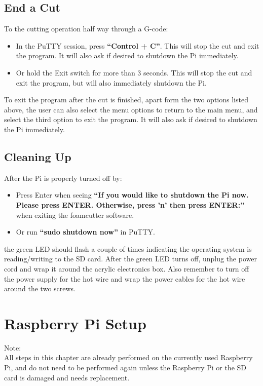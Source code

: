 \documentclass[titlepage,12pt,letter]{report}
\numberwithin{equation}{chapter}
\begin{document}
\section{End a Cut}
To the cutting operation half way through a G-code:
\begin{itemize}[noitemsep,topsep=0pt]
	\item In the PuTTY session, press \textbf{``Control + C''}. This will stop the cut and exit the program. It will also ask if desired to shutdown the Pi immediately.
	\item Or hold the Exit switch for more than 3 seconds. This will stop the cut and exit the program, but will also immediately shutdown the Pi.
\end{itemize}

To exit the program after the cut is finished, apart form the two options listed above, the user can also select the menu options to return to the main menu, and select the third option to exit the program. It will also ask if desired to shutdown the Pi immediately.

\section{Cleaning Up}
After the Pi is properly turned off by:
\begin{itemize}[noitemsep,topsep=0pt]
	\item Press Enter when seeing \textbf{``If you would like to shutdown the Pi now. Please press ENTER. Otherwise, press 'n' then press ENTER:''} when exiting the foamcutter software.
	\item Or run \textbf{``sudo shutdown now''} in PuTTY.
\end{itemize}
the green LED should flash a couple of times indicating the operating system is reading/writing to the SD card. After the green LED turns off, unplug the power cord and wrap it around the acrylic electronics box. Also remember to turn off the power supply for the hot wire and wrap the power cables for the hot wire around the two screws. 


\newpage
\chapter{Raspberry Pi Setup}
\begin{tcolorbox}
	{\large
		Note: \\
		All steps in this chapter are already performed on the currently used Raspberry Pi, and do not need to be performed again unless the Raspberry Pi or the SD card is damaged and needs replacement. 
	}
\end{tcolorbox}
\end{document}
